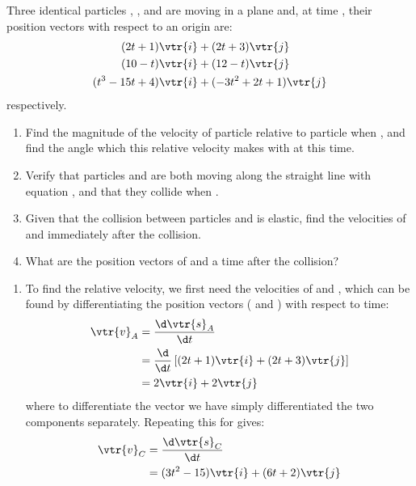 
\begin{problem}[A1988FMIVQ1a] %
{Three identical particles , , and  are moving in a plane and, at time , their position vectors with respect to an origin  are:
\begin{align*} 
(2t +1)\vtr{i} &+ (2t+ 3)\vtr{j}  \\ 
(10 - t)\vtr{i} &+ (12 - t)\vtr{j} \\ 
(t^{3} - 15t + 4)\vtr{i} &+ (-3t^{2} + 2t + 1)\vtr{j} 
\end{align*} 
respectively.
\begin{enumerate}
	\item Find the magnitude of the velocity of particle  relative to particle  when , and find the angle which this relative velocity makes with  at this time.
	\item Verify that particles  and  are both moving along the straight line with equation , and that they collide when .
	\item Given that the collision between particles  and  is elastic, find the velocities of  and  immediately after the collision.
	\item What are the position vectors of  and  a time \vari{\tau} after the collision?
\end{enumerate}
}
{}
{
\begin{enumerate}
	\item To find the relative velocity, we first need the velocities of  and , which can be found by differentiating the position vectors ( and ) with respect to time:
\begin{align*} 
\vtr{v}_{A} &= \frac{\d \vtr{s}_{A}}{\d t} \\ 
&= \frac{\d}{\d t}\left[(2t + 1)\vtr{i} + (2t + 3)\vtr{j}\right] \\ 
&= 2\vtr{i} + 2\vtr{j} 
\end{align*}
where to differentiate the vector we have simply differentiated the two components separately. Repeating this for   gives:
\begin{align*} 
\vtr{v}_{C} & = \frac{\d \vtr{s}_{C}}{\d t} \\ 
&= (3t^{2} - 15)\vtr{i} + (6t + 2)\vtr{j} 
\end{align*}


\end{enumerate}}
\end{problem}

